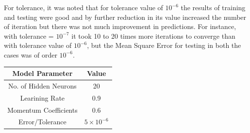 For tolerance, it was noted that for tolerance value of $10^{-6}$ the results of training and testing were good and by further reduction in its value increased the number of iteration but there was not much improvement in predictions. For instance, with tolerance = $10^{-7}$ it took 10 to 20 times more iterations to converge than with tolerance value of $10^{-6}$, but the Mean Square Error for testing in both the cases was of order $10^{-6}$.
\begin{center}
	\begin{tabular}{|c|c|}
		\hline
		\textbf{Model Parameter} & \textbf{Value} \\
		\hline
		No. of Hidden Neurons & 20\\
		\hline
		Learining Rate & 0.9\\
		\hline
		Momentum Coefficients & 0.6\\
		\hline
		Error/Tolerance & $5\times10^{-6}$\\
		\hline
	\end{tabular}
\end{center}
